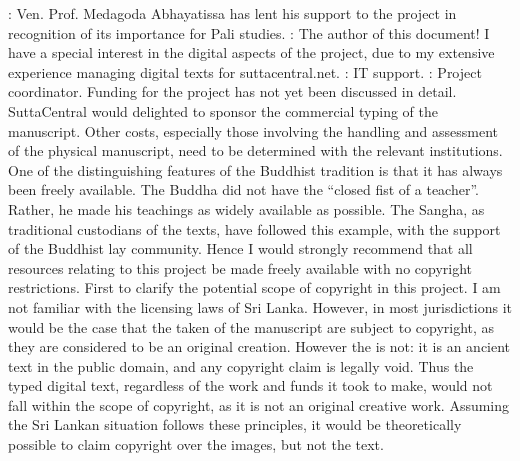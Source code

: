 : Ven. Prof. Medagoda Abhayatissa has lent his support to the project in recognition of its importance for Pali studies.\markdownRendererOlItemEnd 
{}: The author of this document! I have a special interest in the digital aspects of the project, due to my extensive experience managing digital texts for suttacentral.net.\markdownRendererOlItemEnd 
{}: IT support.\markdownRendererOlItemEnd 
{}: Project coordinator.\markdownRendererOlItemEnd 
\markdownRendererOlEnd \markdownRendererInterblockSeparator
{}\markdownRendererInterblockSeparator
{}Funding for the project has not yet been discussed in detail. SuttaCentral would delighted to sponsor the commercial typing of the manuscript. Other costs, especially those involving the handling and assessment of the physical manuscript, need to be determined with the relevant institutions.\markdownRendererInterblockSeparator
{}\markdownRendererInterblockSeparator
{}One of the distinguishing features of the Buddhist tradition is that it has always been freely available. The Buddha did not have the “closed fist of a teacher”. Rather, he made his teachings as widely available as possible. The Sangha, as traditional custodians of the texts, have followed this example, with the support of the Buddhist lay community. Hence I would strongly recommend that all resources relating to this project be made freely available with no copyright restrictions.\markdownRendererInterblockSeparator
{}First to clarify the potential scope of copyright in this project. I am not familiar with the licensing laws of Sri Lanka. However, in most jurisdictions it would be the case that the  taken of the manuscript are subject to copyright, as they are considered to be an original creation. However the  is not: it is an ancient text in the public domain, and any copyright claim is legally void. Thus the typed digital text, regardless of the work and funds it took to make, would not fall within the scope of copyright, as it is not an original creative work. Assuming the Sri Lankan situation follows these principles, it would be theoretically possible to claim copyright over the images, but not the text.\markdownRendererInterblockSeparator
